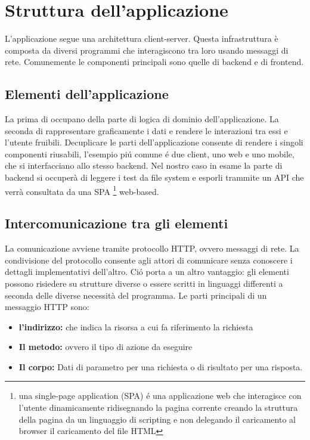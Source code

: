 \chapter{Struttura dell'applicazione}
    L'applicazione segue una architettura client-server.
    Questa infrastruttura è composta da diversi programmi che interagiscono tra loro usando messaggi di rete.
    Comunemente le componenti principali sono quelle di backend e di frontend.    

\section{Elementi dell'applicazione}
    La prima di occupano della parte di logica di dominio dell'applicazione.
    La seconda di rappresentare graficamente i dati e rendere le interazioni tra essi e l'utente fruibili.
    Decuplicare le parti dell'applicazione consente di rendere i singoli componenti riusabili, 
    l'esempio pi\'u comune \'e due client, uno web e uno mobile, che si interfacciano allo stesso backend.
    Nel nostro caso in esame la parte di backend si occuperà di leggere i test da file system e esporli trammite un API 
    che verrà consultata da una SPA \footnote{una single-page application (SPA) \'e una applicazione web che interagisce con l'utente dinamicamente ridisegnando la pagina corrente creando la struttura della pagina da un linguaggio di scripting e non delegando il caricamento al browser il caricamento del file HTML} web-based.

\section{Intercomunicazione tra gli elementi}
    La comunicazione avviene tramite protocollo HTTP, ovvero messaggi di rete.
    La condivisione del protocollo consente agli attori di comunicare senza conoscere i dettagli implementativi dell'altro.
    Ci\'o porta a un altro vantaggio: gli elementi possono risiedere su strutture diverse o essere scritti in linguaggi differenti a seconda delle diverse necessità del programma.
    Le parti principali di un messaggio HTTP sono:
    \begin{itemize}
        \item \textbf{l'indirizzo:} che indica la risorsa a cui fa riferimento la richiesta
        \item \textbf{Il metodo:} ovvero il tipo di azione da eseguire 
        \item \textbf{Il corpo:} Dati di parametro per una richiesta o di risultato per una risposta. 
    \end{itemize}

